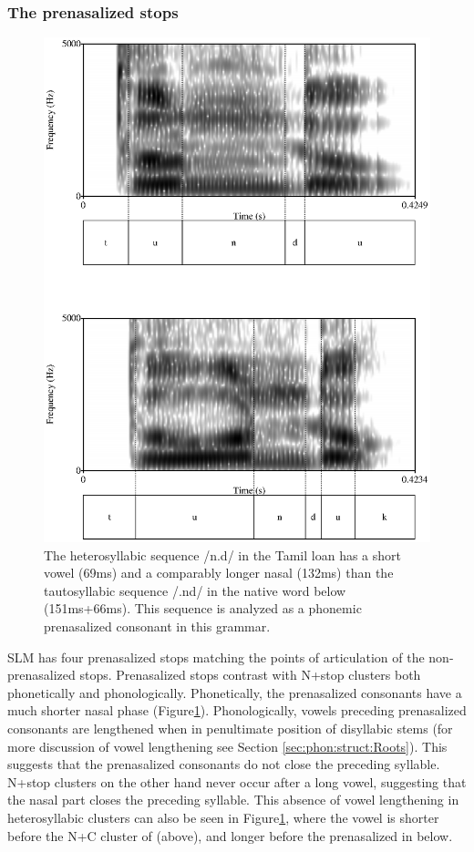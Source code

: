 \subsubsection{The prenasalized stops}\label{sec:phon:Theprenasalizedstops}

\begin{figure}
 \centering 
\includegraphics[width=.8\textwidth]{pics/thunduthuunduk.eps}
\caption[Spectrogram of tautosyllabic and heterosyllabic NC-clusters]{The heterosyllabic sequence /n.d/ in the Tamil loan  has a short vowel (69ms) and a comparably longer nasal (132ms) than the tautosyllabic sequence /.nd/ in the native word  below (151ms+66ms). This sequence is analyzed as a phonemic prenasalized consonant in this grammar.}
\label{fig:thunduthuunduk}
\end{figure}

SLM has four prenasalized stops matching the points of articulation of the non-prenasalized stops. Prenasalized stops contrast with N+stop clusters both phonetically and phonologically. Phonetically, the prenasalized consonants have a much shorter nasal phase (Figure\ref{fig:thunduthuunduk}). Phonologically, vowels preceding prenasalized consonants are lengthened when in penultimate position of disyllabic stems (for more discussion of vowel lengthening see Section \ref{sec:phon:struct:Roots}). This suggests that the prenasalized consonants do not close the preceding syllable. N+stop clusters on the other hand never occur after a long vowel, suggesting that the nasal part closes the preceding syllable. This absence of vowel lengthening in heterosyllabic clusters can also be seen  in Figure\ref{fig:thunduthuunduk}, where the vowel is shorter before the N+C cluster of  (above), and longer before the prenasalized \nd{} in  below.

